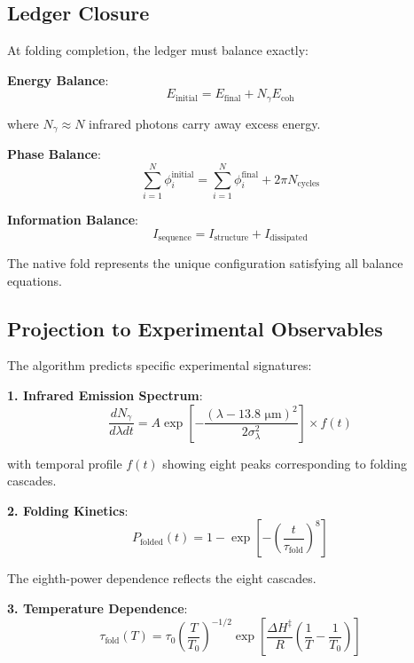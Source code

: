 \documentclass[12pt,a4paper]{article}
\begin{document}
{{\subsection{Ledger Closure}

At folding completion, the ledger must balance exactly:

\textbf{Energy Balance}:
\begin{equation}
E_{\text{initial}} = E_{\text{final}} + N_{\gamma} E_{\text{coh}}
\end{equation}

where $N_{\gamma} \approx N$ infrared photons carry away excess energy.

\textbf{Phase Balance}:
\begin{equation}
\sum_{i=1}^{N} \phi_i^{\text{initial}} = \sum_{i=1}^{N} \phi_i^{\text{final}} + 2\pi N_{\text{cycles}}
\end{equation}

\textbf{Information Balance}:
\begin{equation}
I_{\text{sequence}} = I_{\text{structure}} + I_{\text{dissipated}}
\end{equation}

The native fold represents the unique configuration satisfying all balance equations.

\subsection{Projection to Experimental Observables}

The algorithm predicts specific experimental signatures:

\textbf{1. Infrared Emission Spectrum}:
\begin{equation}
\frac{dN_{\gamma}}{d\lambda dt} = A \exp\left[-\frac{(\lambda - 13.8 \text{ μm})^2}{2\sigma_{\lambda}^2}\right] \times f(t)
\end{equation}

with temporal profile $f(t)$ showing eight peaks corresponding to folding cascades.

\textbf{2. Folding Kinetics}:
\begin{equation}
P_{\text{folded}}(t) = 1 - \exp\left[-\left(\frac{t}{\tau_{\text{fold}}}\right)^8\right]
\end{equation}

The eighth-power dependence reflects the eight cascades.

\textbf{3. Temperature Dependence}:
\begin{equation}
\tau_{\text{fold}}(T) = \tau_0 \left(\frac{T}{T_0}\right)^{-1/2} \exp\left[\frac{\Delta H^{\ddagger}}{R}\left(\frac{1}{T} - \frac{1}{T_0}\right)\right]
\end{equation}

}}
\end{document}
